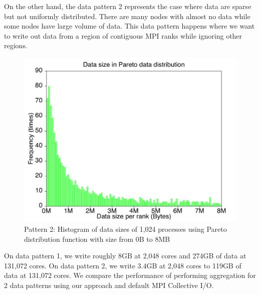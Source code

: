 \documentclass[final,5p,times]{elsarticle}
\begin{document}
On the other hand, the data pattern 2 represents the case where data are sparse but not uniformly distributed. There are many nodes with almost no data while some nodes have large volume of data. This data pattern happens where we want to write out data from a region of contiguous MPI ranks while ignoring other regions.

\begin{figure}[!htb]
\vspace{-0.1in}
\centering
\includegraphics[scale=0.3]{figures/pareto.pdf}
\vspace{-0.1in}
\caption{Pattern 2: Histogram of data sizes of 1,024 processes using Pareto distribution function with size from 0B to 8MB}
\label{fig:pareto}
\vspace{-0.1in}
\end{figure}

On data pattern 1, we write roughly 8GB at 2,048 cores and 274GB of data at 131,072 cores. On data pattern 2, we write 3.4GB at 2,048 cores to 119GB of data at 131,072 cores. We compare the performance of performing aggregation for 2 data patterns using our approach and default MPI Collective I/O.
\end{document}
